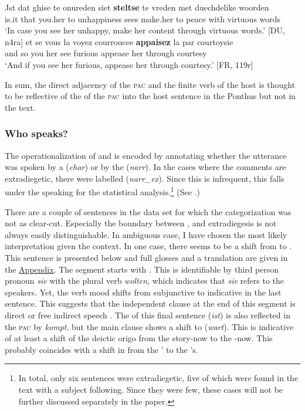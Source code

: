 \documentclass[output=paper,colorlinks,citecolor=brown]{langscibook}
\begin{document}
\ea
\ea \label{ex:NLimp}
\gll Jst dat ghise te onureden siet \textbf{steltse} te vreden met duechdelike woorden\\
is.it that you.her to unhappiness sees make.her to peace with virtuous words\\
\glt `In case you see her unhappy, make her content through virtuous words.' \hfill [DU, n4ra]
\ex \label{ex:FRimp}
\gll et se vous la voyez courroucee \textbf{appaisez} la par courtoysie \\
and so you her see furious appease her through courtesy \\
\glt `And if you see her furious, appease her through courtesy.' \hfill [FR, 119r]
\z
\z

In sum, the direct adjacency of the \textsc{pac} and the finite verb of the host is thought to be reflective of the  of the \textsc{pac} into the host sentence in the  Ponthus but not in the  text.


\subsubsection{Who speaks?}\label{sec:3.3.1}
The operationalization of  and  is encoded by annotating whether the utterance was spoken by a  (\textit{char}) or by the  (\textit{narr}). In the cases where the  comments are extradiegetic, there were labelled (\textit{narr\_ex}). Since this is infrequent, this falls under the  speaking for the statistical analysis.\footnote{In total, only six sentences were extradiegetic, five of which were found in the  text with a subject following. Since they were few, these cases will not be further discussed separately in the paper.} (See .)

There are a couple of sentences in the data set for which the categorization was not as clear-cut. Especially the boundary between ,  and extradiegesis is not always easily distinguishable. In ambiguous case, I have chosen the most likely interpretation given the context. In one case, there seems to be a shift from  to . This sentence is presented below  and full glosses and a translation are given in the \href{bloom:app}{Appendix}. The segment starts with . This is identifiable by third person pronoun \textit{sie} with the plural verb \textit{wolten}, which indicates that \textit{sie} refers to the speakers. Yet, the verb mood shifts from subjunctive to indicative in the last sentence. This suggests that the independent clause at the end of this segment is direct or free indirect speech \citep{Demske2019}. The  of this final sentence (\textit{ist}) is also reflected in the \textsc{pac} by \textit{kompt}, but the main clause shows a  shift to  (\textit{wart}). This is indicative of at least a shift of the deictic origo from the story-now to the -now. This probably coincides with a shift in  from the ' to the 's.
\end{document}

